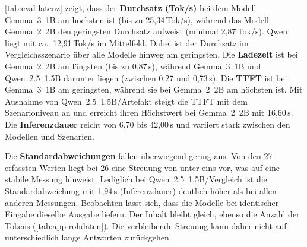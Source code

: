 \noindent \autoref{tab:eval-latenz} zeigt, dass der \textbf{Durchsatz (Tok/s)} bei dem Modell Gemma~3~1B am höchsten ist (bis zu 25{,}34\,Tok/s), während das Modell Gemma~2~2B den geringsten Durchsatz aufweist (minimal 2{,}87\,Tok/s). Qwen liegt mit ca.~12{,}91\,Tok/s im Mittelfeld. Dabei ist der Durchsatz im Vergleichsszenario über alle Modelle hinweg am geringsten.
Die \textbf{Ladezeit} ist bei Gemma~2~2B am längsten (bis zu 0{,}87\,s), während Gemma~3~1B und Qwen~2.5~1.5B darunter liegen (zwischen 0{,}27 und 0{,}73\,s).
Die \textbf{\ac{TTFT}} ist bei Gemma~3~1B am geringsten, während sie bei Gemma~2~2B am höchsten ist. Mit Ausnahme von Qwen~2.5~1.5B/Artefakt steigt die \ac{TTFT} mit dem Szenarioniveau an und erreicht ihren Höchstwert bei Gemma~2~2B mit 16{,}60\,s.
Die \textbf{Inferenzdauer} reicht von 6{,}70 bis 42{,}00\,s und variiert stark zwischen den Modellen und Szenarien.
\vspace{\baselineskip}

\noindent Die \textbf{Standardabweichungen} fallen überwiegend gering aus. Von den 27 erfassten Werten liegt bei 26 eine Streuung von unter eins vor, was auf eine stabile Messung hinweist. Lediglich bei Qwen~2.5~1.5B/Vergleich ist die Standardabweichung mit 1{,}94\,s (Inferenzdauer) deutlich höher als bei allen anderen Messungen.
Beobachten lässt sich, dass die Modelle bei identischer Eingabe dieselbe Ausgabe liefern. Der Inhalt bleibt gleich, ebenso die Anzahl der Tokens (\autoref{tab:app-rohdaten}). Die verbleibende Streuung kann daher nicht auf unterschiedlich lange Antworten zurückgehen.
\vspace{\baselineskip}

